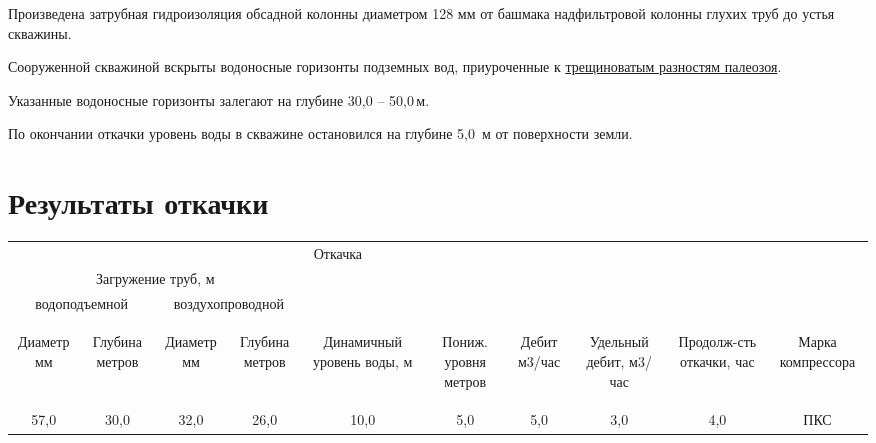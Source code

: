 \documentclass[a4paper,12pt]{article} %
\newcommand{\txtDepth}{50,0}						%
\newcommand{\txtDebit}{5,0}							%
\newcommand{\txtLevel}{5,0}							%
\newcommand{\txtGeology}{трещиноватым разностям палеозоя}
\begin{document}
\bigskip

Произведена затрубная гидроизоляция обсадной колонны диаметром 128 мм от башмака надфильтровой колонны глухих труб до устья скважины.

Сооруженной скважиной вскрыты водоносные горизонты  подземных вод, приуроченные к \underline{\txtGeology}.

Указанные водоносные горизонты залегают на глубине   30,0 – \txtDepth \,м.

По окончании откачки уровень воды в скважине остановился на глубине  \txtLevel \, м от поверхности земли.

\section*{Результаты откачки}

\begin{center}
\begin{tabular}{|c|c|c|c|c|c|c|c|c|c|}
	\hline 
	\multicolumn{8}{|c|}{Откачка}&  &  \\ 
	\cline{1-8} 
	\multicolumn{4}{|c|}{Загружение труб, м}  &  &  &  &  &  &  \\ 
	\cline{1-4} 
	\multicolumn{2}{|c|}{водоподъемной} & \multicolumn{2}{c|}{воздухопроводной} &  &  &  &  &  & \\ 
	\cline{1-4} 
	\begin{sideways}Диаметр мм\end{sideways} &
	\begin{sideways}Глубина метров\end{sideways} &
	\begin{sideways}Диаметр мм\end{sideways} &
	\begin{sideways}Глубина метров\end{sideways} &
	\begin{sideways}Динамичный уровень воды, м\end{sideways} &
	\begin{sideways}Пониж. уровня метров\end{sideways} &
	\begin{sideways}Дебит м3/час\end{sideways} &
	\begin{sideways}Удельный дебит, м3/час\end{sideways} &
	\begin{sideways}Продолж-сть откачки, час\end{sideways} &
	\begin{sideways}Марка компрессора\end{sideways} \\ 
	\hline 
	57,0 & 30,0 & 32,0 & 26,0 & 10,0 & 5,0 & \txtDebit & 3,0 & 4,0 & ПКС \\ 
	\hline 
\end{tabular} 
\end{center}
\end{document}
